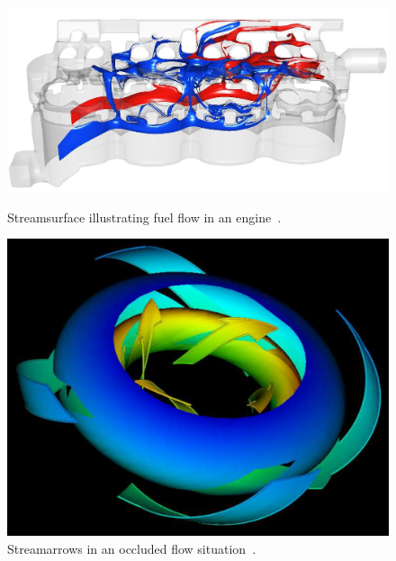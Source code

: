 \begin{figure}[!htbp]
	\centering
	\begin{minipage}[t]{.45\textwidth}
		\centering
		\includegraphics[width=1.05\textwidth]{images/streamSurface}
		\caption{Streamsurface illustrating fuel flow in an engine~\cite{Laramee2005a}.}
		\label{fig:streamSurface}
	\end{minipage}\qquad
	\begin{minipage}[t]{.45\textwidth}
		\centering
		\includegraphics[width=.8\textwidth]{images/streamArrows2}
		\caption{Streamarrows in an occluded flow situation~\cite{Loffelmann1997}.}
		\label{fig:streamArrows2}
	\end{minipage}
\end{figure}

